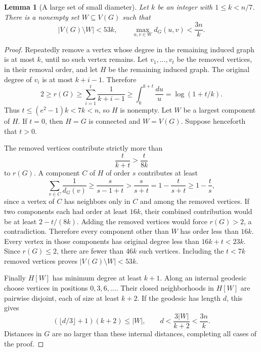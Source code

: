 \documentclass[11pt]{amsart}
\newtheorem{lemma}[theorem]{Lemma}
\theoremstyle{definition}
\theoremstyle{remark}
\begin{document}
\begin{lemma}[A large set of small diameter]\label{lem:large_core}
Let $k$ be an integer with $1\le k<n/7$. There is a nonempty set
$W\subseteq V(G)$ such that
\[
 |V(G)\setminus W|<53k,
 \qquad
 \max_{u,v\in W}d_G(u,v)< \frac{3n}{k}.
\]
\end{lemma}
\begin{proof}
Repeatedly remove a vertex whose degree in the remaining induced graph is
at most $k$, until no such vertex remains. Let $v_1,\ldots,v_t$ be the
removed vertices, in their removal order, and let $H$ be the remaining
induced graph. The original degree of $v_i$ is at most $k+i-1$. Therefore
\[
 2\ge r(G)\ge\sum_{i=1}^t\frac1{k+i-1}
 \ge\int_k^{k+t}\frac{du}{u}
 =\log(1+t/k).
\]
Thus $t\le(e^2-1)k<7k<n$, so $H$ is nonempty.
Let $W$ be a largest component of $H$.
If $t=0$, then $H=G$ is connected and $W=V(G)$.
Suppose henceforth that $t>0$.

The removed vertices contribute strictly more than
\[
 \frac{t}{k+t}>\frac{t}{8k}
\]
to $r(G)$. A component $C$ of $H$ of order $s$ contributes at least
\[
 \sum_{v\in C}\frac1{d_G(v)}
 \ge\frac{s}{s-1+t}
 >\frac{s}{s+t}
 =1-\frac{t}{s+t}\ge1-\frac{t}{s},
\]
since a vertex of $C$ has neighbors only in $C$ and among the removed
vertices. If two components each had order at least $16k$, their
combined contribution would be at least $2-t/(8k)$. Adding the removed
vertices would force $r(G)>2$, a contradiction.
Therefore every component other than $W$ has order less than $16k$.
Every vertex in those components has original degree less than
$16k+t<23k$. Since $r(G)\le2$, there are fewer than $46k$ such vertices.
Including the $t<7k$ removed vertices proves
$|V(G)\setminus W|<53k$.

Finally $H[W]$ has minimum degree at least $k+1$. Along an internal
geodesic choose vertices in positions $0,3,6,\ldots$. Their closed
neighborhoods in $H[W]$ are pairwise disjoint, each of size at least
$k+2$. If the geodesic has length $d$, this gives
\[
 (\lfloor d/3\rfloor+1)(k+2)\le |W|,
 \qquad d<\frac{3|W|}{k+2}<\frac{3n}{k}.
\]
Distances in $G$ are no larger than these internal distances, completing
all cases of the proof.
\end{proof}
\end{document}
